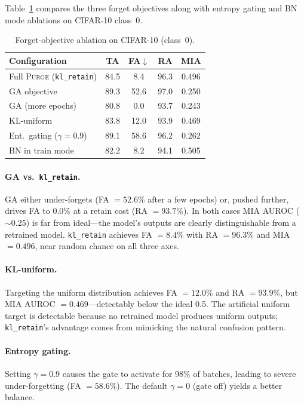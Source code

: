 \documentclass[letterpaper]{article}
\newcommand{\ours}{\textsc{Purge}}
\newcommand{\klr}{\texttt{kl\_retain}}
\begin{document}
Table~\ref{tab:ablation_objectives} compares the three forget objectives along with entropy gating and BN mode ablations on CIFAR-10 class~0.

\begin{table}[t]
\centering
\small
\caption{Forget-objective ablation on CIFAR-10 (class~0).}
\label{tab:ablation_objectives}
\begin{tabular}{lcccc}
\toprule
\textbf{Configuration} & \textbf{TA} & \textbf{FA}$\downarrow$ & \textbf{RA} & \textbf{MIA} \\
\midrule
Full \ours{} (\klr{}) & 84.5 & 8.4 & 96.3 & 0.496 \\
GA objective & 89.3 & 52.6 & 97.0 & 0.250 \\
GA (more epochs) & 80.8 & 0.0 & 93.7 & 0.243 \\
KL-uniform & 83.8 & 12.0 & 93.9 & 0.469 \\
Ent.\ gating ($\gamma{=}0.9$) & 89.1 & 58.6 & 96.2 & 0.262 \\
BN in train mode & 82.2 & 8.2 & 94.1 & 0.505 \\
\bottomrule
\end{tabular}
\end{table}

\paragraph{GA vs.\ \klr{}.}
GA either under-forgets (FA $= 52.6$\% after a few epochs) or, pushed further, drives FA to $0.0$\% at a retain cost (RA $= 93.7$\%). In both cases MIA AUROC ($\sim$0.25) is far from ideal---the model's outputs are clearly distinguishable from a retrained model. \klr{} achieves FA $= 8.4$\% with RA $= 96.3$\% and MIA $= 0.496$, near random chance on all three axes.

\paragraph{KL-uniform.}
Targeting the uniform distribution achieves FA $= 12.0$\% and RA $= 93.9$\%, but MIA AUROC $= 0.469$---detectably below the ideal 0.5. The artificial uniform target is detectable because no retrained model produces uniform outputs; \klr{}'s advantage comes from mimicking the natural confusion pattern.

\paragraph{Entropy gating.}
Setting $\gamma = 0.9$ causes the gate to activate for 98\% of batches, leading to severe under-forgetting (FA $= 58.6$\%). The default $\gamma = 0$ (gate off) yields a better balance.
\end{document}
